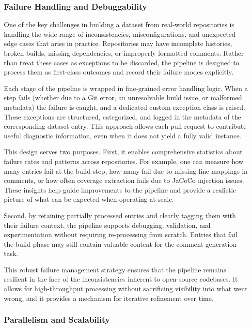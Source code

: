 \subsubsection{Failure Handling and Debuggability}

One of the key challenges in building a dataset from real-world repositories is handling the wide
range of inconsistencies, misconfigurations, and unexpected edge cases that arise in practice.
Repositories may have incomplete histories, broken builds, missing dependencies, or improperly
formatted comments. Rather than treat these cases as exceptions to be discarded, the pipeline is
designed to process them as first-class outcomes and record their failure modes explicitly.

Each stage of the pipeline is wrapped in fine-grained error handling logic. When a step fails
(whether due to a Git error, an unresolvable build issue, or malformed metadata) the failure is
caught, and a dedicated custom exception class is raised. These exceptions are structured,
categorized, and logged in the metadata of the corresponding dataset entry. This approach allows
each pull request to contribute useful diagnostic information, even when it does not yield a fully
valid instance.

This design serves two purposes. First, it enables comprehensive statistics about failure rates and
patterns across repositories. For example, one can measure how many entries fail at the build step,
how many fail due to missing line mappings in comments, or how often coverage extraction fails due
to JaCoCo injection issues. These insights help guide improvements to the pipeline and provide a
realistic picture of what can be expected when operating at scale.

Second, by retaining partially processed entries and clearly tagging them with their failure
context, the pipeline supports debugging, validation, and experimentation without requiring
re-processing from scratch. Entries that fail the build phase may still contain valuable
content for the comment generation task.

This robust failure management strategy ensures that the pipeline remains resilient in the face of
the inconsistencies inherent to open-source codebases. It allows for high-throughput processing
without sacrificing visibility into what went wrong, and it provides a mechanism for iterative
refinement over time.

\subsubsection{Parallelism and Scalability}

